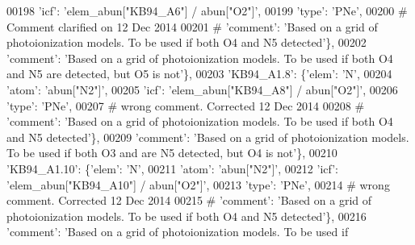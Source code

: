 \begin{DoxyCode}
00198                                      \textcolor{stringliteral}{'icf'}: \textcolor{stringliteral}{'elem\_abun["KB94\_A6"]  / abun["O2"]'},
00199                                      \textcolor{stringliteral}{'type'}: \textcolor{stringliteral}{'PNe'},
00200 \textcolor{comment}{# Comment clarified on 12 Dec 2014 }
00201 \textcolor{comment}{#                                      'comment': 'Based on a grid of photoionization models. To be used if
       both O4 and N5 detected'\},}
00202                                       \textcolor{stringliteral}{'comment'}: \textcolor{stringliteral}{'Based on a grid of photoionization models. To be used if
       both O4 and N5 are detected, but O5 is not'}\},
00203                          \textcolor{stringliteral}{'KB94\_A1.8'}: \{\textcolor{stringliteral}{'elem'}: \textcolor{stringliteral}{'N'},
00204                                      \textcolor{stringliteral}{'atom'}: \textcolor{stringliteral}{'abun["N2"]'},
00205                                      \textcolor{stringliteral}{'icf'}: \textcolor{stringliteral}{'elem\_abun["KB94\_A8"]  / abun["O2"]'},
00206                                      \textcolor{stringliteral}{'type'}: \textcolor{stringliteral}{'PNe'},
00207 \textcolor{comment}{# wrong comment. Corrected 12 Dec 2014}
00208 \textcolor{comment}{#                                     'comment': 'Based on a grid of photoionization models. To be used if
       both O4 and N5 detected'\},}
00209                                      \textcolor{stringliteral}{'comment'}: \textcolor{stringliteral}{'Based on a grid of photoionization models. To be used if
       both O3 and are N5 detected, but O4 is not'}\},
00210                          \textcolor{stringliteral}{'KB94\_A1.10'}: \{\textcolor{stringliteral}{'elem'}: \textcolor{stringliteral}{'N'},
00211                                      \textcolor{stringliteral}{'atom'}: \textcolor{stringliteral}{'abun["N2"]'},
00212                                      \textcolor{stringliteral}{'icf'}: \textcolor{stringliteral}{'elem\_abun["KB94\_A10"]  / abun["O2"]'},
00213                                      \textcolor{stringliteral}{'type'}: \textcolor{stringliteral}{'PNe'},
00214 \textcolor{comment}{# wrong comment. Corrected 12 Dec 2014}
00215 \textcolor{comment}{#                                      'comment': 'Based on a grid of photoionization models. To be used if
       both O4 and N5 detected'\},}
00216                                       \textcolor{stringliteral}{'comment'}: \textcolor{stringliteral}{'Based on a grid of photoionization models. To be used if
}
\end{DoxyCode}
